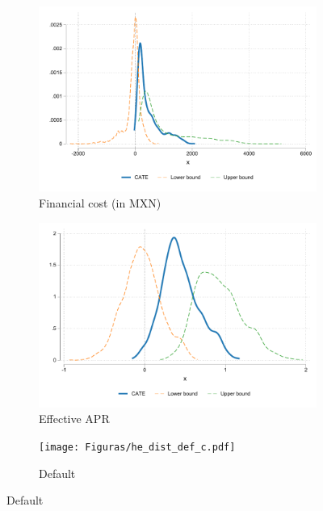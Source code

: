 \vspace{.3in}
\begin{figure}[H]
     \caption{Heterogeneous Treatment Effects}
    \label{heterogeneous_effects}
    \begin{center}
    \begin{subfigure}{.45\textwidth}
      \caption{Financial cost (in MXN)}
        \centering
        \includegraphics[width=\textwidth]{Figuras/he_dist_fc_admin.pdf}
    \end{subfigure}
     \begin{subfigure}{0.45\textwidth}
    \caption{Effective APR}
       \centering
      \includegraphics[width=\textwidth]{Figuras/he_dist_eff.pdf}
    \end{subfigure}
     \begin{subfigure}{0.45\textwidth}
    \caption{Default}
       \centering
      \texttt{[image: Figuras/he\_dist\_def\_c.pdf]}

\end{subfigure}
\end{center}
\end{figure}
